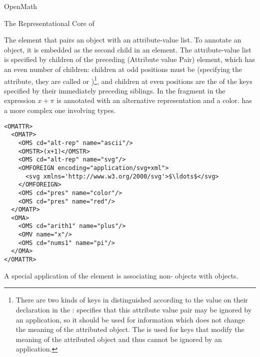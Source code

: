 \begin{omgroup}[id=mobj,short=Mathematical Objects]
\begin{omgroup}[id=openmath]{OpenMath}
\begin{module}[id=OpenMath]
\begin{omgroup}[id=om.core]{The Representational Core of {\openmath}}
\begin{definition}[id=omattr.def]
  The {} element that pairs an {\openmath} object with an
  attribute-value list. To annotate an {\openmath} object, it is embedded as the second
  child in an {} element. The attribute-value list is specified
  by children of the preceding {} (Attribute value Pair) element,
  which has an even number of children: children at odd positions must be
  {} (specifying the attribute, they are called  or
  )\footnote{There are two kinds of keys in {\openmath} distinguished
    according to the {} value on their {}
    declaration in the {}:
    {} specifies that this attribute value pair may be
    ignored by an application, so it should be used for information which does not change
    the meaning of the attributed {\openmath} object. The {} is
    used for keys that modify the meaning of the attributed {\openmath} object and thus
    cannot be ignored by an application.}, and children at even positions are the
   of the keys specified by their immediately preceding siblings. In the
  {\openmath} fragment in {} the expression $x+\pi$ is annotated with an
  alternative representation and a color.  {} has a more complex
  one involving types.
\end{definition}

\begin{lstlisting}[language=OpenMath,label=lst:omattr,mathescape,
                   caption={Associating Alternate Representations with an
                   {\openmath} Object},
                   numbers=none,index={OMATTR,OMATP}]
<OMATTR>
  <OMATP>
    <OMS cd="alt-rep" name="ascii"/>
    <OMSTR>(x+1)</OMSTR>
    <OMS cd="alt-rep" name="svg"/>
    <OMFOREIGN encoding="application/svg+xml">
      <svg xmlns='http://www.w3.org/2000/svg'>$\ldots$</svg>
    </OMFOREIGN>
    <OMS cd="pres" name="color"/>
    <OMS cd="pres" name="red"/>
  </OMATP>
  <OMA>
    <OMS cd="arith1" name="plus"/>
    <OMV name="x"/>
    <OMS cd="nums1" name="pi"/>
  </OMA>
</OMATTR>
\end{lstlisting}

A special application of the {} element is associating
non-{} objects with {\openmath} objects.


\end{omgroup}
\end{module}
\end{omgroup}
\end{omgroup}
